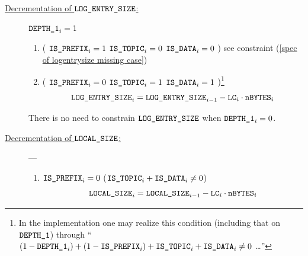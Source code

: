 		\begin{description}
			\item[\underline{Decrementation of $\texttt{LOG\_ENTRY\_SIZE}$:}] \label{spec of logentrysize} \If $\texttt{DEPTH\_1}_{i}=1$ \Then
				\begin{enumerate}
					\item \If \Big(
						$\texttt{IS\_PREFIX}_{i} = 1$
						\et $\texttt{IS\_TOPIC}_{i} = 0$
						\et $\texttt{IS\_DATA}_{i} = 0$
						\Big) \Then see constraint (\ref{spec of logentrysize missing case})
					\item \If \Big(
						$\texttt{IS\_PREFIX}_{i} = 0$
						\Or $\texttt{IS\_TOPIC}_{i} = 1$
						\Or $\texttt{IS\_DATA}_{i} = 1$
						\Big)\footnote{In the implementation one may realize this condition (including that on $\texttt{DEPTH\_1}$) through
						``\If $(1 - \texttt{DEPTH\_1}_{i})
						+ (1 - \texttt{IS\_PREFIX}_{i})
						+ \texttt{IS\_TOPIC}_{i}
						+ \texttt{IS\_DATA}_{i} \neq 0$ \Then \dots{}''} \Then
						\[
							\texttt{LOG\_ENTRY\_SIZE}_{i} = \texttt{LOG\_ENTRY\_SIZE}_{i-1} - \texttt{LC}_{i} \cdot \texttt{nBYTES}_{i}
						\]
				\end{enumerate}
				\saNote{} There is no need to constrain $\texttt{LOG\_ENTRY\_SIZE}$ when $\texttt{DEPTH\_1}_{i}=0$.
			\item[\underline{Decrementation of $\texttt{LOCAL\_SIZE}$:}] ---
				\begin{enumerate}
					\item \If $\texttt{IS\_PREFIX}_{i}=0$ \et ($\texttt{IS\_TOPIC}_{i} + \texttt{IS\_DATA}_{i} \neq 0$) \Then
						\[ \texttt{LOCAL\_SIZE}_{i} = \texttt{LOCAL\_SIZE}_{i-1} - \texttt{LC}_{i} \cdot \texttt{nBYTES}_{i} \]
				\end{enumerate}
		\end{description}
